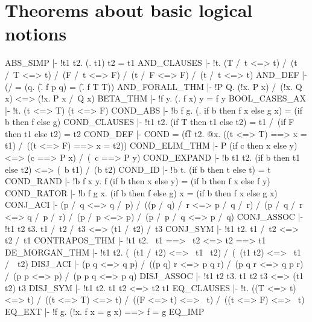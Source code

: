 \section{Theorems about basic logical notions}
\THEOREM ABS\_SIMP
  |- !t1 t2. (\x. t1) t2 = t1
\ENDTHEOREM
\THEOREM AND\_CLAUSES
  |- !t. (T /\ t <=> t) /\
         (t /\ T <=> t) /\
         (F /\ t <=> F) /\
         (t /\ F <=> F) /\
         (t /\ t <=> t)
\ENDTHEOREM
\THEOREM AND\_DEF
  |- (/\) = (\p q. (\f. f p q) = (\f. f T T))
\ENDTHEOREM
\THEOREM AND\_FORALL\_THM
  |- !P Q. (!x. P x) /\ (!x. Q x) <=> (!x. P x /\ Q x)
\ENDTHEOREM
\THEOREM BETA\_THM
  |- !f y. (\x. f x) y = f y
\ENDTHEOREM
\THEOREM BOOL\_CASES\_AX
  |- !t. (t <=> T) \/ (t <=> F)
\ENDTHEOREM
\THEOREM COND\_ABS
  |- !b f g. (\x. if b then f x else g x) = (if b then f else g)
\ENDTHEOREM
\THEOREM COND\_CLAUSES
  |- !t1 t2. (if T then t1 else t2) = t1 /\ (if F then t1 else t2) = t2
\ENDTHEOREM
\THEOREM COND\_DEF
  |- COND = (\t t1 t2. @x. ((t <=> T) ==> x = t1) /\ ((t <=> F) ==> x = t2))
\ENDTHEOREM
\THEOREM COND\_ELIM\_THM
  |- P (if c then x else y) <=> (c ==> P x) /\ (~c ==> P y)
\ENDTHEOREM
\THEOREM COND\_EXPAND
  |- !b t1 t2. (if b then t1 else t2) <=> (~b \/ t1) /\ (b \/ t2)
\ENDTHEOREM
\THEOREM COND\_ID
  |- !b t. (if b then t else t) = t
\ENDTHEOREM
\THEOREM COND\_RAND
  |- !b f x y. f (if b then x else y) = (if b then f x else f y)
\ENDTHEOREM
\THEOREM COND\_RATOR
  |- !b f g x. (if b then f else g) x = (if b then f x else g x)
\ENDTHEOREM
\THEOREM CONJ\_ACI
  |- (p /\ q <=> q /\ p) /\
     ((p /\ q) /\ r <=> p /\ q /\ r) /\
     (p /\ q /\ r <=> q /\ p /\ r) /\
     (p /\ p <=> p) /\
     (p /\ p /\ q <=> p /\ q)
\ENDTHEOREM
\THEOREM CONJ\_ASSOC
  |- !t1 t2 t3. t1 /\ t2 /\ t3 <=> (t1 /\ t2) /\ t3
\ENDTHEOREM
\THEOREM CONJ\_SYM
  |- !t1 t2. t1 /\ t2 <=> t2 /\ t1
\ENDTHEOREM
\THEOREM CONTRAPOS\_THM
  |- !t1 t2. ~t1 ==> ~t2 <=> t2 ==> t1
\ENDTHEOREM
\THEOREM DE\_MORGAN\_THM
  |- !t1 t2. (~(t1 /\ t2) <=> ~t1 \/ ~t2) /\ (~(t1 \/ t2) <=> ~t1 /\ ~t2)
\ENDTHEOREM
\THEOREM DISJ\_ACI
  |- (p \/ q <=> q \/ p) /\
     ((p \/ q) \/ r <=> p \/ q \/ r) /\
     (p \/ q \/ r <=> q \/ p \/ r) /\
     (p \/ p <=> p) /\
     (p \/ p \/ q <=> p \/ q)
\ENDTHEOREM
\THEOREM DISJ\_ASSOC
  |- !t1 t2 t3. t1 \/ t2 \/ t3 <=> (t1 \/ t2) \/ t3
\ENDTHEOREM
\THEOREM DISJ\_SYM
  |- !t1 t2. t1 \/ t2 <=> t2 \/ t1
\ENDTHEOREM
\THEOREM EQ\_CLAUSES
  |- !t. ((T <=> t) <=> t) /\
         ((t <=> T) <=> t) /\
         ((F <=> t) <=> ~t) /\
         ((t <=> F) <=> ~t)
\ENDTHEOREM
\THEOREM EQ\_EXT
  |- !f g. (!x. f x = g x) ==> f = g
\ENDTHEOREM
\THEOREM EQ\_IMP

